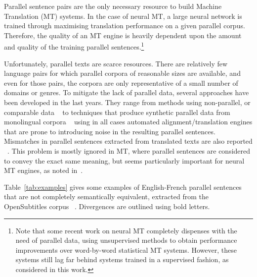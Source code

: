 \documentclass[11pt,a4paper]{article}
\begin{document}
Parallel sentence pairs are the only necessary resource to build Machine Translation (MT) systems.
In the case of neural MT, a large neural network is trained through maximising translation performance on a given parallel corpus. 
Therefore, the quality of an MT engine is heavily dependent upon the
amount and quality of the training parallel sentences.\footnote{Note
  that some recent work on neural MT
  \cite{lample2018word,artetxe2018iclr} completely dispenses with the
  need of parallel data, using unsupervised methods to obtain performance
  improvements over word-by-word statistical MT systems. However, these systems
  still lag far behind systems trained in a supervised fashion, as
  considered in this work.} 

Unfortunately, parallel texts are scarce resources. 
There are relatively few language pairs for which parallel corpora of
reasonable sizes are available, and even for those pairs, the corpora
are only representative of a small number of domains or genres. 
To mitigate the lack of parallel data, several approaches have been developed in the last years.
They range from methods using non-parallel, or comparable data ~\cite{Zhao:2002:APS:844380.844785,W04-3208,J05-4003,W17-2509,P17-3003} to techniques that produce synthetic parallel data from monolingual corpora ~\cite{P16-1009,W17-4714} using in all cases automated alignment/translation engines that are prone to introducing noise in the resulting parallel sentences. 
Mismatches in parallel sentences extracted from translated texts are also reported ~\cite{tiedemann2011bitext,XU16.310}. 
This problem is mostly ignored in MT, where parallel sentences are considered to convey the exact same meaning, but seems particularly important for neural MT engines, as noted in~\citet{chen2016adaptation}.

Table~\ref{tab:examples} gives some examples of English-French
parallel sentences that are not completely semantically equivalent, 
extracted from the OpenSubtitles corpus ~\cite{LisonTiedemann2016}. 
Divergences are outlined using bold letters. 
\end{document}
